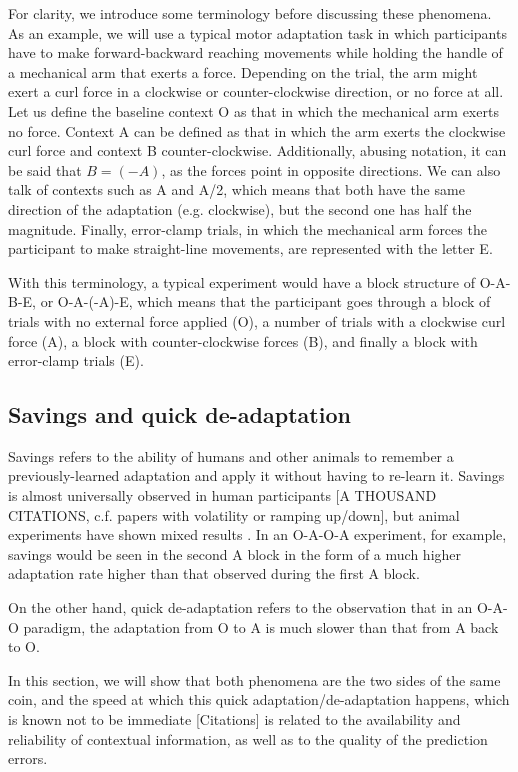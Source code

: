\documentclass[a4paper,doc,floatsintext,natbib]{apa6}
\begin{document}
For clarity, we introduce some terminology before discussing these phenomena. As an example, we will use a typical motor adaptation task in which participants have to make forward-backward reaching movements while holding the handle of a mechanical arm that exerts a force. Depending on the trial, the arm might exert a curl force in a clockwise or counter-clockwise direction, or no force at all. Let us define the baseline context O as that in which the mechanical arm exerts no force. Context A can be defined as that in which the arm exerts the clockwise curl force and context B counter-clockwise. Additionally, abusing notation, it can be said that $B = (-A)$, as the forces point in opposite directions. We can also talk of contexts such as A and A/2, which means that both have the same direction of the adaptation (e.g. clockwise), but the second one has half the magnitude. Finally, error-clamp trials, in which the mechanical arm forces the participant to make straight-line movements, are represented with the letter E.

With this terminology, a typical experiment \cite[e.g.][]{Ethier_Spontaneous_2008} would have a block structure of O-A-B-E, or O-A-(-A)-E, which means that the participant goes through a block of trials with no external force applied (O), a number of trials with a clockwise curl force (A), a block with counter-clockwise forces (B), and finally a block with error-clamp trials (E).

\subsection{Savings and quick de-adaptation}
Savings refers to the ability of humans and other animals to remember a previously-learned adaptation and apply it without having to re-learn it. Savings is almost universally observed in human participants [A THOUSAND CITATIONS, c.f. papers with volatility or ramping up/down], but animal experiments have shown mixed results \citep[e.g.][]{Kojima_Memory_2004}. In an O-A-O-A experiment, for example, savings would be seen in the second A block in the form of a much higher adaptation rate higher than that observed during the first A block.

On the other hand, quick de-adaptation refers to the observation that in an O-A-O paradigm, the adaptation from O to A is much slower than that from A back to O.

In this section, we will show that both phenomena are the two sides of the same coin, and the speed at which this quick adaptation/de-adaptation happens, which is known not to be immediate [Citations] is related to the availability and reliability of contextual information, as well as to the quality of the prediction errors.
\end{document}
